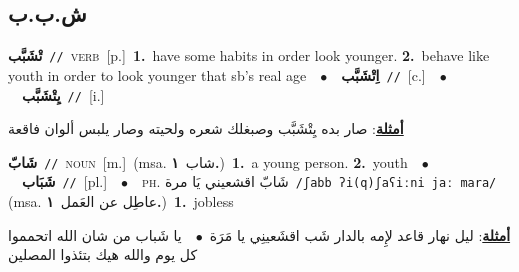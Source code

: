 \documentclass[10pt,a4paper,twoside]{article} %
\begin{document}
\begin{multicols}{2}
\vspace{-3mm}
\subsection*{\color{blue}\foreignlanguage{arabic}{ش.ب.ب}\color{blue}{}} 

{\setlength\topsep{0pt}\textbf{\foreignlanguage{arabic}{تْشَبَّب}}\ {\color{gray}\texttt{//}\color{black}}\ \textsc{verb}\ [p.]\ \textbf{1.}~have some habits in order look younger.  \textbf{2.}~behave like youth in order to look younger that sb's real age\ \ $\bullet$\ \ \setlength\topsep{0pt}\textbf{\foreignlanguage{arabic}{اِتْشَبَّب}}\ {\color{gray}\texttt{//}\color{black}}\ [c.]\ \ $\bullet$\ \ \setlength\topsep{0pt}\textbf{\foreignlanguage{arabic}{يِتْشَبَّب}}\ {\color{gray}\texttt{//}\color{black}}\ [i.]\  \begin{flushright}\color{gray}\foreignlanguage{arabic}{\textbf{\underline{\foreignlanguage{arabic}{أمثلة}}}: صار بده يِتْشَبَّب وصبغلك شعره ولحيته وصار يلبس ألوان فاقعة}\end{flushright}\color{black}} \vspace{2mm}

{\setlength\topsep{0pt}\textbf{\foreignlanguage{arabic}{شَابّ}}\ {\color{gray}\texttt{//}\color{black}}\ \textsc{noun}\ [m.]\ \color{gray}(msa. \foreignlanguage{arabic}{شاب}~\foreignlanguage{arabic}{\textbf{١.}})\color{black}\ \textbf{1.}~a young person.  \textbf{2.}~youth\ \ $\bullet$\ \ \setlength\topsep{0pt}\textbf{\foreignlanguage{arabic}{شَبَاب}}\ {\color{gray}\texttt{//}\color{black}}\ [pl.]\ \ $\bullet$\ \ \textsc{ph.} \color{gray} \foreignlanguage{arabic}{شَابّ اقشعيني يَا مرة}\color{black}\ {\color{gray}\texttt{/{\sffamily ʃabb ʔi(q)ʃaʕiːni jaː mara}/}\color{black}}\ \color{gray} (msa. \foreignlanguage{arabic}{عاطِل عن العَمل}~\foreignlanguage{arabic}{\textbf{١.}})\color{black}\ \textbf{1.}~jobless\  \begin{flushright}\color{gray}\foreignlanguage{arabic}{\textbf{\underline{\foreignlanguage{arabic}{أمثلة}}}: ليل نهار قاعد لإِمه بالدار شَب اقشَعينِي يا مَرَة\ $\bullet$\ \  يا شَباب من شان الله اتحمموا كل يوم والله هيك بتئذوا المصلين}\end{flushright}\color{black}} \vspace{2mm}


\end{multicols}
\end{document}
